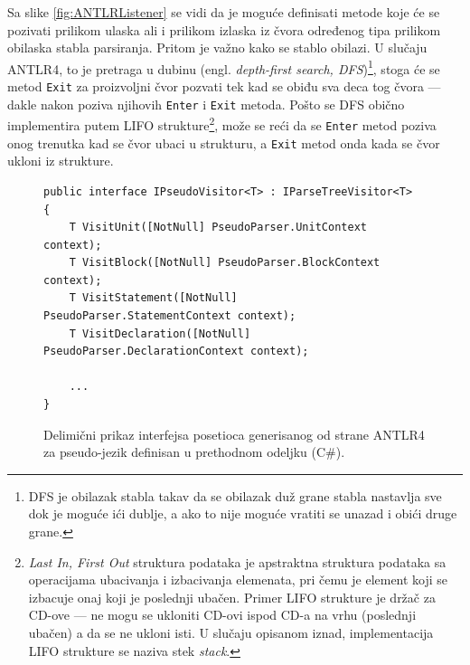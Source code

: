 Sa slike \ref{fig:ANTLRListener} se vidi da je moguće definisati metode koje će se pozivati prilikom ulaska ali i prilikom izlaska iz čvora određenog tipa prilikom obilaska stabla parsiranja. Pritom je važno kako se stablo obilazi. U slučaju ANTLR4, to je pretraga u dubinu (engl. \emph{depth-first search, DFS})\footnote{DFS je obilazak stabla takav da se obilazak duž grane stabla nastavlja sve dok je moguće ići dublje, a ako to nije moguće vratiti se unazad i obići druge grane.}, stoga će se metod \texttt{Exit} za proizvoljni čvor pozvati tek kad se obiđu sva deca tog čvora --- dakle nakon poziva njihovih \texttt{Enter} i \texttt{Exit} metoda. Pošto se DFS obično implementira putem LIFO strukture\footnote{\emph{Last In, First Out} struktura podataka je apstraktna struktura podataka sa operacijama ubacivanja i izbacivanja elemenata, pri čemu je element koji se izbacuje onaj koji je poslednji ubačen. Primer LIFO strukture je držač za CD-ove --- ne mogu se ukloniti CD-ovi ispod CD-a na vrhu (poslednji ubačen) a da se ne ukloni isti. U slučaju opisanom iznad, implementacija LIFO strukture se naziva stek \emph{stack}.}, može se reći da se \texttt{Enter} metod poziva onog trenutka kad se čvor ubaci u strukturu, a \texttt{Exit} metod onda kada se čvor ukloni iz strukture.

\begin{figure}[h!]
\begin{lstlisting}
public interface IPseudoVisitor<T> : IParseTreeVisitor<T>
{
    T VisitUnit([NotNull] PseudoParser.UnitContext context);
    T VisitBlock([NotNull] PseudoParser.BlockContext context);
    T VisitStatement([NotNull] PseudoParser.StatementContext context);
    T VisitDeclaration([NotNull] PseudoParser.DeclarationContext context);
    
    ...
}
\end{lstlisting}
\caption{Delimični prikaz interfejsa posetioca generisanog od strane ANTLR4 za pseudo-jezik definisan u prethodnom odeljku (C\#).}
\label{fig:ANTLRVisitor}
\end{figure}

